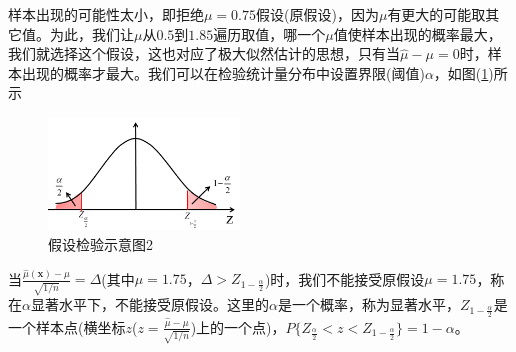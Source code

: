         样本出现的可能性太小，即拒绝$\mu = 0.75$假设(原假设)，因为$\mu$有更大的可能取其它值。为此，我们让$\mu$从$0.5$到$1.85$遍历取值，哪一个$\mu$值使样本出现的概率最大，我们就选择这个假设，这也对应了极大似然估计的思想，只有当$\hat{\mu} - \mu =0$时，样本出现的概率才最大。我们可以在检验统计量分布中设置界限(阈值)$\alpha$，如图(\ref{fig:假设检验示意图2})所示
            \begin{figure}[H]
            \centering
            \includegraphics[height=3cm]{images/hypothetical_test2.jpg}
            \caption{假设检验示意图2}
            \label{fig:假设检验示意图2}
            \end{figure}
        当$\frac{\hat{\mu}(\mathbf{x}) - \mu}{\sqrt{1/n}} = \Delta$(其中$\mu=1.75$，$\Delta > Z_{1-\frac{\alpha}{2}}$)时，我们不能接受原假设$\mu=1.75$，称在$\alpha$显著水平下，不能接受原假设。这里的$\alpha$是一个概率，称为显著水平，$Z_{1-\frac{\alpha}{2}}$是一个样本点(横坐标$z$($z = \frac{\hat{\mu} - \mu}{\sqrt{1/n}}$)上的一个点)，$P\{Z_{\frac{\alpha}{2}}<z<Z_{1-\frac{\alpha}{2}}\} = 1-\alpha$。

